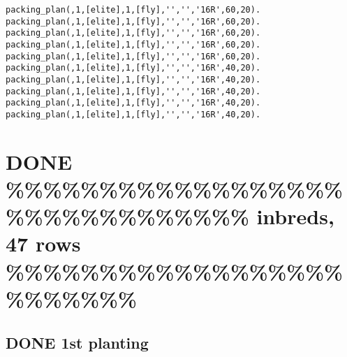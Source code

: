 \documentclass[11pt]{article}
\begin{document}
\begin{verbatim}
packing_plan(,1,[elite],1,[fly],'','','16R',60,20).
packing_plan(,1,[elite],1,[fly],'','','16R',60,20).
packing_plan(,1,[elite],1,[fly],'','','16R',60,20).
packing_plan(,1,[elite],1,[fly],'','','16R',60,20).
packing_plan(,1,[elite],1,[fly],'','','16R',60,20).
packing_plan(,1,[elite],1,[fly],'','','16R',40,20).
packing_plan(,1,[elite],1,[fly],'','','16R',40,20).
packing_plan(,1,[elite],1,[fly],'','','16R',40,20).
packing_plan(,1,[elite],1,[fly],'','','16R',40,20).
packing_plan(,1,[elite],1,[fly],'','','16R',40,20).
\end{verbatim}





\section{{\bfseries\sffamily DONE} \%\%\%\%\%\%\%\%\%\%\%\%\%\%\%\%\%\%\%\%\%\%\%\%\%\%\%\%\%\%\% inbreds, 47 rows \%\%\%\%\%\%\%\%\%\%\%\%\%\%\%\%\%\%\%\%\%\%\%\%\%}
\label{sec-3}

\subsection{{\bfseries\sffamily DONE} 1st planting}
\label{sec-3-1}
\end{document}
